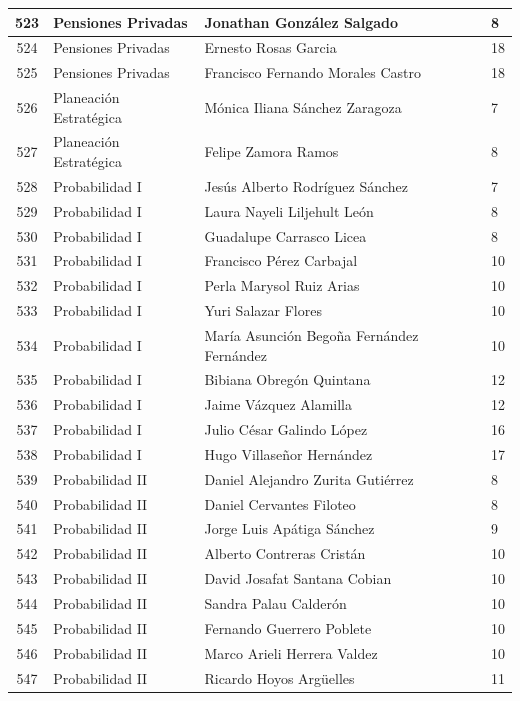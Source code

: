 {\begin{longtable}{|c|p{6.5cm}|p{5cm}|p{1.5cm}|}
  523 & Pensiones Privadas & Jonathan González Salgado & 8 \\ \hline
  524 & Pensiones Privadas & Ernesto Rosas Garcia & 18 \\ \hline
  525 & Pensiones Privadas & Francisco Fernando Morales Castro & 18 \\ \hline
  526 & Planeación Estratégica & Mónica Iliana Sánchez Zaragoza & 7 \\ \hline
  527 & Planeación Estratégica & Felipe Zamora Ramos & 8 \\ \hline
  528 & Probabilidad I & Jesús Alberto Rodríguez Sánchez & 7 \\ \hline
  529 & Probabilidad I & Laura Nayeli Liljehult León & 8 \\ \hline
  530 & Probabilidad I & Guadalupe Carrasco Licea & 8 \\ \hline
  531 & Probabilidad I & Francisco Pérez Carbajal & 10 \\ \hline
  532 & Probabilidad I & Perla Marysol Ruiz Arias & 10 \\ \hline
  533 & Probabilidad I & Yuri Salazar Flores & 10 \\ \hline
  534 & Probabilidad I & María Asunción Begoña Fernández Fernández & 10 \\ \hline
  535 & Probabilidad I & Bibiana Obregón Quintana & 12 \\ \hline
  536 & Probabilidad I & Jaime Vázquez Alamilla & 12 \\ \hline
  537 & Probabilidad I & Julio César Galindo López & 16 \\ \hline
  538 & Probabilidad I & Hugo Villaseñor Hernández & 17 \\ \hline
  539 & Probabilidad II & Daniel Alejandro Zurita Gutiérrez & 8 \\ \hline
  540 & Probabilidad II & Daniel Cervantes Filoteo & 8 \\ \hline
  541 & Probabilidad II & Jorge Luis Apátiga Sánchez & 9 \\ \hline
  542 & Probabilidad II & Alberto Contreras Cristán & 10 \\ \hline
  543 & Probabilidad II & David Josafat Santana Cobian & 10 \\ \hline
  544 & Probabilidad II & Sandra Palau Calderón & 10 \\ \hline
  545 & Probabilidad II & Fernando Guerrero Poblete & 10 \\ \hline
  546 & Probabilidad II & Marco Arieli Herrera Valdez & 10 \\ \hline
  547 & Probabilidad II & Ricardo Hoyos Argüelles & 11 \\ \hline

\end{longtable}}

